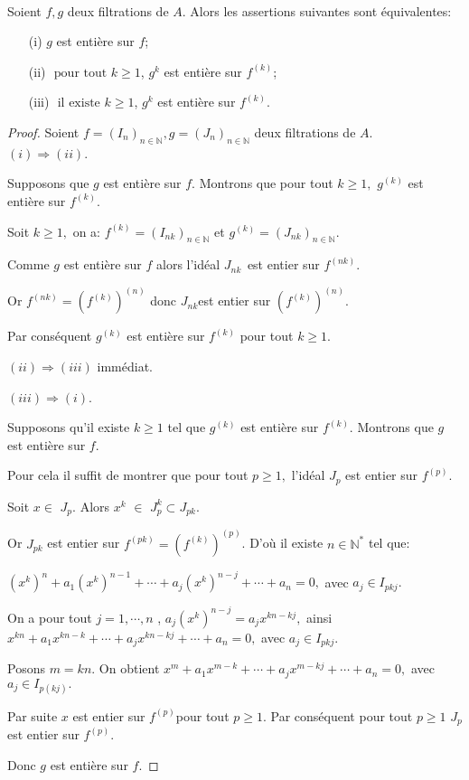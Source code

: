 \begin{maproposition} \cite{Di2} \\
	Soient $f,g$ deux filtrations de $A$. Alors les assertions suivantes sont équivalentes:
	\begin{enumerate}
		\item[(i)] $g$ est entière sur $f$;
		\item[(ii)] $\text{ pour tout } k \geqslant 1$, $g^{k}$ est entière sur $f^{(k)}$;
		\item[(iii)] $\text{ il existe } k \geqslant 1$, $g^{k}$ est entière sur $f^{(k)}$.
	\end{enumerate}
\end{maproposition}
\begin{proof}
	Soient $f=(I_n)_{n \in \mathbb{N}},g=(J_n)_{n \in \mathbb{N}}$ deux filtrations de $A$. \\
	$(i)\Longrightarrow (ii)$.
	
	Supposons que $g$ est entière sur $f.$ Montrons que pour tout $k\geq 1,$ $g^{(k)}$ est entière sur $f^{(k)}.$
	
	Soit $k\geq 1,$ on a: $f^{(k)}=(I_{nk})_{n\in \mathbb{N}}$ et $g^{(k)}=(J_{nk})_{n\in \mathbb{N}}$.
	
	Comme $g$ est entière sur $f$ alors l'idéal $J_{nk\text{ }}$est entier sur $f^{(nk)}.$
	
	Or $f^{(nk)}=(f^{(k)})^{(n)}$ donc $J_{nk}$est entier sur $(f^{(k)})^{(n)}.$
	
	Par conséquent $g^{(k)}$ est entière sur $f^{(k)}$ pour tout $k\geq 1.$
	
	$(ii)\Longrightarrow (iii)$ immédiat.
	
	$(iii)\Longrightarrow (i)$.
	
	Supposons qu'il existe $k\geq 1$ tel que $g^{(k)}$ est entière sur $f^{(k)}$. Montrons que $g$ est entière sur $f.$
	
	Pour cela il suffit de montrer que pour tout $p\geq 1,$ l'idéal $J_{p}$ est entier sur $f^{(p)}.$
	
	Soit $x\in $ $J_{p}.$ Alors $x^{k}$ $\in $ $J_{p}^{k}\subset J_{pk}.$
	
	Or $J_{pk}$ est entier sur $f^{(pk)}=(f^{(k)})^{(p)}$. D'où il existe $n\in \mathbb{N}^{\ast }$ tel que:
	
	$(x^{k})^{n}+a_{1}(x^{k})^{n-1}+\cdots +a_{j}(x^{k})^{n-j}+\cdots +a_{n}=0,$ avec $a_{j}\in I_{pkj}.$
	
	On a pour tout $j=1,\cdots ,n$ , $a_{j}(x^{k})^{n-j}=a_{j}x^{kn-kj},$ ainsi $x^{kn}+a_{1}x^{kn-k}+\cdots +a_{j}x^{kn-kj}+\cdots +a_{n}=0,$ avec $a_{j}\in I_{pkj}.$
	
	Posons $m=kn.$ On obtient $x^{m}+a_{1}x^{m-k}+\cdots +a_{j}x^{m-kj}+\cdots +a_{n}=0,$ avec $a_{j}\in I_{p(kj)}.$
	
	Par suite $x$ est entier sur $f^{(p)}$pour tout $p\geq 1.$ Par conséquent pour tout $p\geq 1$ $J_{p}$ est entier sur $f^{(p)}.$
	
	Donc $g$ est entière sur $f.$
	
\end{proof}

